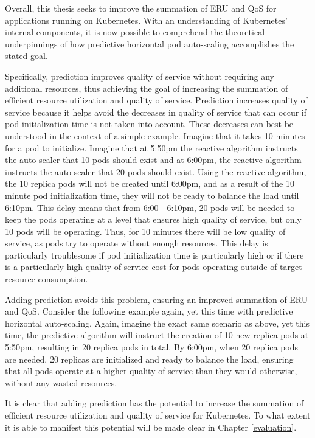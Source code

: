 Overall, this thesis seeks to improve the summation of ERU and QoS for
applications running on Kubernetes.
With an understanding of Kubernetes' internal components, it is now
possible to comprehend the theoretical underpinnings of how predictive
horizontal pod auto-scaling accomplishes the stated goal.

Specifically, prediction improves quality of service without
requiring any additional resources, thus achieving the goal of increasing the
summation of efficient resource utilization and quality of service. Prediction
increases quality of service because it helps avoid the decreases in quality of
service that can occur if pod initialization time is not taken into account.
These decreases can best be understood in the context of a simple example.
Imagine that it takes 10 minutes for a pod to initialize. Imagine that at 5:50pm
the reactive algorithm instructs the auto-scaler that 10 pods should exist and at
6:00pm, the reactive algorithm instructs the auto-scaler that 20 pods should
exist. Using the reactive algorithm, the 10 replica pods will not be created
until 6:00pm, and as a result of the 10 minute pod initialization time, they
will not be ready to balance the load until 6:10pm. This delay means that from
6:00 - 6:10pm, 20 pods will be needed to keep the pods operating at a level that
ensures high quality of service, but only 10 pods will be operating. Thus, for
10 minutes there will be low quality of service, as pods try to operate without
enough resources. This delay is particularly troublesome if pod initialization
time is particularly high or if there is a particularly high quality of service
cost for pods operating outside of target resource consumption.

Adding prediction avoids this problem, ensuring an improved summation of ERU and
QoS. Consider the following example again, yet this time with predictive
horizontal auto-scaling. Again, imagine the exact same scenario as above, yet
this time, the predictive algorithm will instruct the creation of 10 new replica
pods at 5:50pm, resulting in 20 replica pods in total.
By 6:00pm, when 20 replica pods are needed, 20 replicas are
initialized and ready to balance the load, ensuring that all pods operate at a
higher quality of service than they would otherwise, without any wasted
resources.

It is clear that adding prediction has the potential to increase the summation
of efficient resource utilization and quality of service for Kubernetes. To what
extent it is able to manifest this potential will be made clear in Chapter
\ref{evaluation}.
